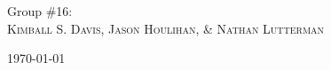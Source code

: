 \documentclass[11pt]{article}
\begin{document}
\begin{titlepage}
	\Large{Group \#16:}\\
		 \Large\textsc{Kimball S. Davis, Jason Houlihan, \& Nathan Lutterman} %
	
	
	\vfill\vfill\vfill\vfill %
	
	{\large\today} %
	
	
	 
	
	\vfill %
	
\end{titlepage}

\setlength{\columnsep}{.2 in}

\setlength{\parskip}{0pt}

	
\end{document}
